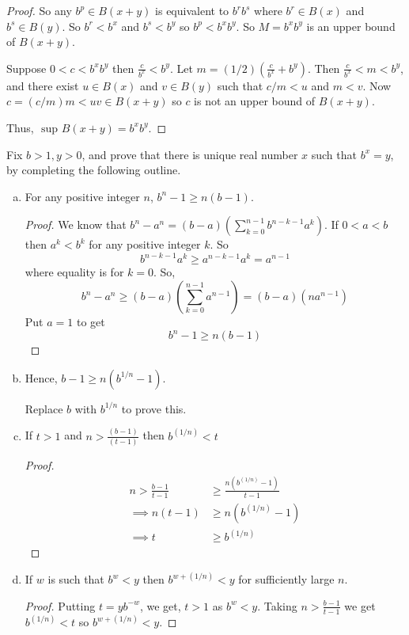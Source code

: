 \begin{prblm}
\begin{enumerate}[(a)]
\begin{proof}
			So any $b^p \in B(x + y)$ is equivalent to $b^r b^s$ where $b^r \in B(x)$ and $b^s \in B(y)$.
			So $b^r < b^x$ and $b^s < b^y$ so $b^p < b^x b^y$.
			So $M = b^x b^y$ is an upper bound of $B(x + y)$.

			Suppose $0 < c < b^x b^y$ then $\frac{c}{b^x} < b^y$.
			Let $m = (1/2)(\frac{c}{b^x} + b^y)$. Then $\frac{c}{b^x} < m < b^y$,
			and there exist $u \in B(x)$ and $v \in B(y)$ such that $c / m < u$ and $m < v$.
			Now $c = (c/m)m < uv \in B(x + y)$ so $c$ is not an upper bound of $B(x + y)$.

			Thus, $\text{ sup } B(x+y) = b^x b^y$.
		\end{proof}
	\end{enumerate}
\end{prblm}

\begin{prblm}
	Fix $b > 1, y > 0$, and prove that there is unique real number $x$ such that $b^x = y$,
	by completing the following outline.
	\begin{enumerate}[(a)]
		\item For any positive integer $n$, $b^n - 1 \geq n(b-1)$.
		\begin{proof}
			We know that $b^n - a^n = (b - a)( \sum_{k=0}^{n-1} b^{n-k-1} a^k)$.
			If $0 < a < b$ then $a^k < b^k$ for any positive integer $k$. So $$b^{n-k-1}a^k \geq a^{n-k-1}a^k = a^{n-1}$$ where equality is for $k = 0$.
			So, $$ b^n - a^n \geq (b-a) \left( \sum_{k=0}^{n-1} a^{n-1} \right) = (b-a)(n a^{n-1})$$
			Put $a = 1$ to get $$ b^n - 1 \geq n(b-1) $$

		\end{proof}

		\item Hence, $b - 1 \geq n(b^{1/n} - 1)$.

		Replace $b$ with $b^{1/n}$ to prove this.

		\item If $t > 1$ and $n > \frac{(b-1)}{(t-1)}$ then $b^{(1/n)} < t$

		\begin{proof}
			\begin{align*}
				n > \frac{b-1}{t-1} & \geq \frac{n(b^{(1/n)} - 1)}{t-1} \\
				\implies n(t - 1) & \geq n(b^{(1/n)} - 1) \\
				\implies t & \geq b^{(1/n)}
			\end{align*}
		\end{proof}

		\item If $w$ is such that $b^w < y$ then $b^{w + (1/n)} < y$ for sufficiently large $n$.
		\begin{proof}
			Putting $t = y b^{-w}$, we get, $t > 1$ as $b^w < y$.
			Taking $n > \frac{b-1}{t-1}$ we get $b^{(1/n)} < t$ so $b^{w + (1/n)} < y$.


\end{proof}
\end{enumerate}
\end{prblm}

